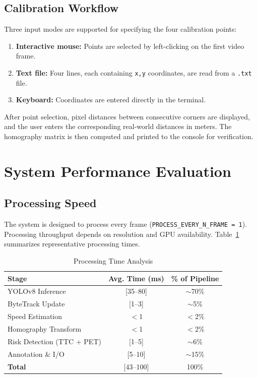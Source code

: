 \documentclass[12pt]{report}
\begin{document}
\subsection{Calibration Workflow}

Three input modes are supported for specifying the four calibration points:

\begin{enumerate}
    \item \textbf{Interactive mouse:} Points are selected by left-clicking on the first video frame.
    \item \textbf{Text file:} Four lines, each containing \texttt{x,y} coordinates, are read from a \texttt{.txt} file.
    \item \textbf{Keyboard:} Coordinates are entered directly in the terminal.
\end{enumerate}

After point selection, pixel distances between consecutive corners are displayed, and the user enters the corresponding real-world distances in meters.
The homography matrix is then computed and printed to the console for verification.

\section{System Performance Evaluation}

\subsection{Processing Speed}

The system is designed to process every frame (\texttt{PROCESS\_EVERY\_N\_FRAME = 1}).
Processing throughput depends on resolution and GPU availability.
Table~\ref{tab:processing} summarizes representative processing times.

\begin{table}[H]
    \centering
    \caption{Processing Time Analysis}
    \label{tab:processing}
    \begin{tabular}{lcc}
        \toprule
        \textbf{Stage} & \textbf{Avg. Time (ms)} & \textbf{\% of Pipeline} \\
        \midrule
        YOLOv8 Inference & [35--80] & $\sim$70\% \\
        ByteTrack Update & [1--3] & $\sim$5\% \\
        Speed Estimation & $<$1 & $<$2\% \\
        Homography Transform & $<$1 & $<$2\% \\
        Risk Detection (TTC + PET) & [1--5] & $\sim$6\% \\
        Annotation \& I/O & [5--10] & $\sim$15\% \\
        \midrule
        \textbf{Total} & [43--100] & 100\% \\
        \bottomrule
    \end{tabular}
\end{table}
\end{document}
